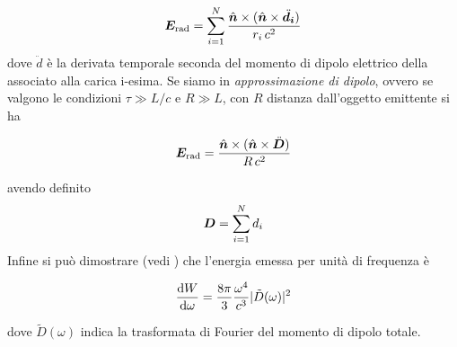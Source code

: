 \begin{equation}
\V{E}_\mathrm{rad} = \sum_{i=1}^N \dfrac{\vers{n}\times(\vett{\hat{n}}{\ddot{d}_i})}{r_i\, c^2}
\end{equation}
dove $\ddot{d}$ è la derivata temporale seconda del momento di dipolo elettrico della associato alla carica i-esima. Se siamo in \textit{approssimazione di dipolo}, ovvero se valgono le condizioni $\tau\gg L/c$ e $R\gg L$, con $R$ distanza dall'oggetto emittente si ha 
\begin{EQ}
\begin{equation}
\V{E}_\mathrm{rad} = \dfrac{\vers{n}\times(\vett{\hat{n}}{\ddot{D}})}{R\, c^2}
\end{equation}
\end{EQ}
avendo definito
\begin{equation}
\V{D}= \sum_{i=1}^N d_i
\end{equation}
Infine si può dimostrare (vedi \cite{book:Rybicki}) che l'energia emessa per unità di frequenza è 
\begin{EQ}
\begin{equation}
\dfrac{\mathrm{d} {W}}{\mathrm{d} {\omega}} = \dfrac{8\pi}{3} \dfrac{\omega^4}{c^3} |\tilde{D}(\omega)|^2 \label{eq:Larmor4}
\end{equation}
\end{EQ}
dove $\tilde{D}(\omega)$ indica la trasformata di Fourier del momento di dipolo totale.

